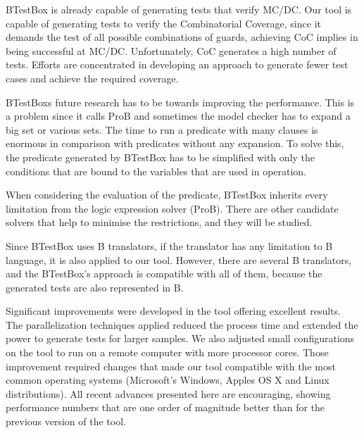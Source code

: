 \documentclass[runningheads]{llncs}
\begin{document}
BTestBox is already capable of generating tests that verify MC/DC. Our tool is capable of generating tests to verify the Combinatorial Coverage, since it demands the test of all possible combinations of guards, achieving CoC implies in being successful at MC/DC. Unfortunately, CoC generates a high number of tests. Efforts are concentrated in developing an approach to generate fewer test cases and achieve the required coverage.

BTestBox\textquotesingle s future research has to be towards improving the performance. This is a problem since it calls ProB and sometimes the model checker has to expand a big set or various sets. The time to run a predicate with many clauses is enormous in comparison with predicates without any expansion. To solve this, the predicate generated by BTestBox has to be simplified with only the conditions that are bound to the variables that are used in operation.

When considering the evaluation of the predicate, BTestBox inherits every limitation from the logic expression solver (ProB). There are other candidate solvers that help to minimise the restrictions, and they will be studied.

Since BTestBox uses B translators, if the translator has any limitation to B language, it is also applied to our tool. However, there are several B translators, and the BTestBox's approach is compatible with all of them, because the generated tests are also represented in B. 

Significant improvements were developed in the tool offering excellent results.
The parallelization techniques applied reduced the process time and extended the power to generate tests for larger samples. We also adjusted small configurations on the tool to run on a remote computer with more processor cores. Those improvement required changes that made our tool compatible with the most common operating systems (Microsoft’s Windows, Apple\textquotesingle s OS X and Linux distributions). All recent advances presented here are encouraging, showing performance numbers that are one order of magnitude better than for the previous version of the tool.





%
%
%




 
\end{document}
